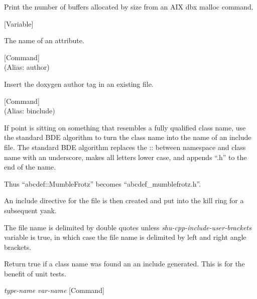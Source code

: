 \begin{doc-string}
Print the number of buffers allocated by size from an AIX dbx malloc command.
\end{doc-string}

\vspace{1em}
\noindent
{}
\usebox{\funcname}
 \hfill [Variable]

\begin{doc-string}
The name of an attribute.
\end{doc-string}

\vspace{1em}
\noindent
{}
\usebox{\funcname}
 \hfill [Command]\\%
 (Alias: author)

\begin{doc-string}
Insert the doxygen author tag in an existing file.
\end{doc-string}

\vspace{1em}
\noindent
{}
\usebox{\funcname}
 \hfill [Command]\\%
 (Alias: binclude)

\begin{doc-string}
If point is sitting on something that resembles a fully qualified class name,
use the standard BDE algorithm to turn the class name into the name of an
include file.  The standard BDE algorithm replaces the :: between namespace and
class name with an underscore, makes all letters lower case, and appends ``.h''
to the end of the name.

Thus ``abcdef::MumbleFrotz'' becomes ``abcdef\_mumblefrotz.h''.

An include directive for the file is then created and put into the kill ring for
a subsequent yank.

The file name is delimited by double quotes unless \emph{shu-cpp-include-user-brackets}
variable is true, in which case the file name is delimited by left and right
angle brackets.

Return true if a class name was found an an include generated.  This is for the
benefit of unit tests.
\end{doc-string}

\vspace{1em}
\noindent
{}
\usebox{\funcname}\emph{type-name} \emph{var-name}
 \hfill [Command]

